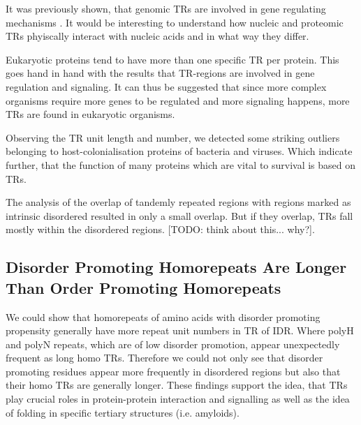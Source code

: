 \documentclass[a4,center,fleqn]{NAR}
\begin{document}
It was previously shown, that genomic TRs are involved in gene regulating mechanisms \cite{Bilgin2015, Theriot2013}. It would be interesting to understand how nucleic and proteomic TRs phyiscally interact with nucleic acids and in what way they differ. 

Eukaryotic proteins tend to have more than one specific TR per protein. This goes hand in hand with the results that TR-regions are involved in gene regulation and signaling. It can thus be suggested that since more complex organisms require more genes to be regulated and more signaling happens, more TRs are found in eukaryotic organisms. 

Observing the TR unit length and number, we detected some striking outliers belonging to host-colonialisation proteins of bacteria and viruses. Which indicate further, that the function of many proteins which are vital to survival is based on TRs.

The analysis of the overlap of tandemly repeated regions with regions marked as intrinsic disordered resulted in only a small overlap. But if they overlap, TRs fall mostly within the disordered regions.  [TODO: think about this... why?].

\subsection{Disorder Promoting Homorepeats Are Longer Than Order Promoting Homorepeats}
We could show that homorepeats of amino acids with disorder promoting propensity generally have more repeat unit numbers in TR of IDR. Where polyH and polyN repeats, which are of low disorder promotion, appear unexpectedly frequent as long homo TRs.
Therefore we could not only see that disorder promoting residues appear more frequently in disordered regions but also that their homo TRs are generally longer. 
These findings support the idea, that TRs play crucial roles in protein-protein interaction and signalling as well as the idea of folding in specific tertiary structures (i.e. amyloids).
\end{document}

